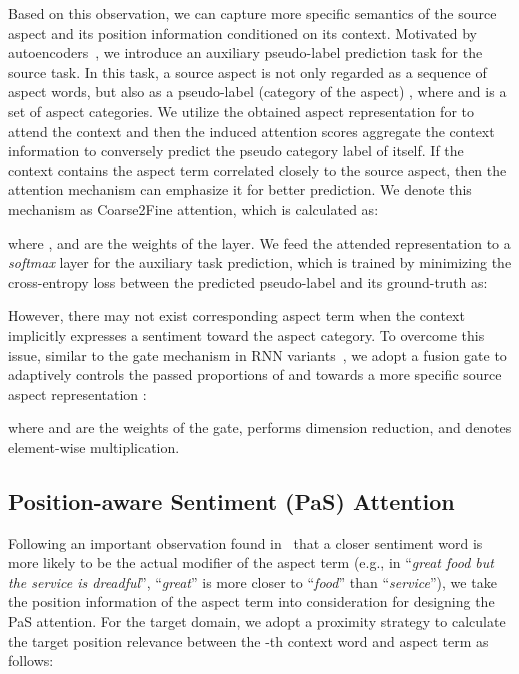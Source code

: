 \documentclass[letterpaper]{article} \usepackage{aaai19}  \usepackage{times}  \usepackage{latexsym}
\begin{document}
Based on this observation, we can capture more specific semantics of the source aspect and its position information conditioned on its context. Motivated by autoencoders~\cite{bengio2007greedy}, we introduce an auxiliary pseudo-label prediction task for the source task. In this task, a source aspect  is not only regarded as a sequence of aspect words, but also as a pseudo-label (category of the aspect) , where  and  is a set of aspect categories. We utilize the obtained aspect representation  for  to attend the context and then the induced attention scores aggregate the context information to conversely predict the pseudo category label of  itself. If the context contains the aspect term correlated closely to the source aspect, then the attention mechanism can emphasize it for better prediction. We denote this mechanism as Coarse2Fine attention, which is calculated as:

where ,  and  are the weights of the layer. We feed the attended representation  to a {\it softmax} layer for the auxiliary task prediction, which is trained by minimizing the cross-entropy loss between the predicted pseudo-label  and its ground-truth  as:


However, there may not exist corresponding aspect term when the context implicitly expresses a sentiment toward the aspect category. To overcome this issue, similar to the gate mechanism in RNN variants~\cite{jozefowicz2015empirical}, we adopt a fusion gate  to adaptively controls the passed proportions of  and  towards a more specific source aspect representation : 

where  and  are the weights of the gate,  performs dimension reduction, and  denotes element-wise multiplication.

\subsection{Position-aware Sentiment (PaS) Attention}
Following an important observation found in~\cite{tang2016aspect,chen2017recurrent} that a closer sentiment word is more likely to be the actual modifier of the aspect term (e.g., in ``{\it great food but the service is dreadful}'', ``{\it great}'' is more closer to ``{\it food}'' than ``{\it service}''), we take the position information of the aspect term into consideration for designing the PaS attention. For the target domain, we adopt a proximity strategy to calculate the target position relevance between the -th context word and aspect term as follows:
\end{document}

